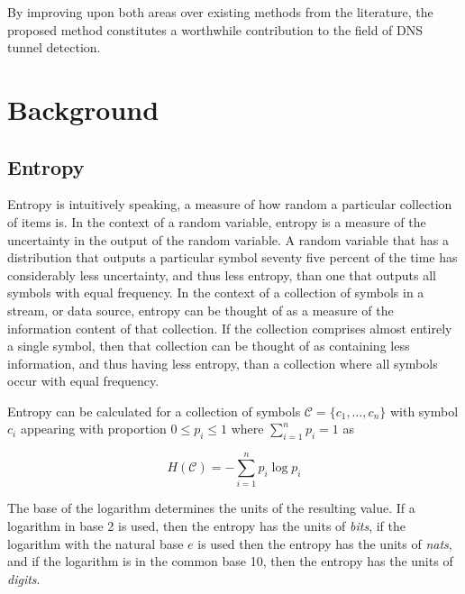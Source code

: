 \documentclass[12pt]{report}
\theoremstyle{remark}
\theoremstyle{definition}
\theoremstyle{definition}
\theoremstyle{definition}
\begin{document}
By improving upon both areas over existing methods from the literature, the
proposed method constitutes a worthwhile contribution to the field of DNS tunnel
detection.

\newpage

\chapter{Background}

\section{Entropy}
Entropy\cite{WolframAlpha-EntropyWord}\cite{WolframAlpha-EntropyMath} is
intuitively speaking, a measure of how random a particular collection of items
is. In the context of a random variable, entropy is a measure of the uncertainty
in the output of the random variable. A random variable that has a distribution
that outputs a particular symbol seventy five percent of the time has
considerably less uncertainty, and thus less entropy, than one that outputs all
symbols with equal frequency. In the context of a collection of symbols in a
stream, or data source, entropy can be thought of as a measure of the information
content of that collection. If the collection comprises almost entirely a single
symbol, then that collection can be thought of as containing less information,
and thus having less entropy, than a collection where all symbols occur with
equal frequency.

Entropy can be calculated for a collection of symbols
$\mathcal{C}=\{c_1,\ldots,c_n\}$ with symbol $c_i$ appearing with proportion
$0\leq p_i\leq 1$ where $\sum_{i=1}^n{p_i}=1$ as

 \[H(\mathcal{C})=-\sum_{i=1}^n{p_i \log{p_i}}\]

The base of the logarithm determines the units of the resulting value. If a
logarithm in base 2 is used, then the entropy has the units of \emph{bits}, if
the logarithm with the natural base $e$ is used then the entropy has the units
of \emph{nats}, and if the logarithm is in the common base 10, then the entropy has
the units of \emph{digits}.
\end{document}
